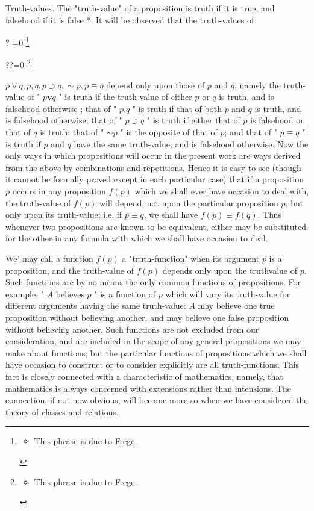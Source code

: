 \documentclass[10pt]{article}
\let\svthefootnote\thefootnote
\newcommand\blfootnotetext[1]{%
  \let\thefootnote\relax\footnote{#1}%
  \addtocounter{footnote}{-1}%
  \let\thefootnote\svthefootnote%
}
\let\svfootnotetext\footnotetext
\renewcommand\footnotetext[2][?]{%
  \if\relax#1\relax%
    \ifnum\value{footnote}=0\blfootnotetext{#2}\else\svfootnotetext{#2}\fi%
  \else%
    \if?#1\ifnum\value{footnote}=0\blfootnotetext{#2}\else\svfootnotetext{#2}\fi%
    \else\svfootnotetext[#1]{#2}\fi%
  \fi
}
\begin{document}
Truth-values. The "truth-value" of a proposition is truth if it is true, and falsehood if it is false *. It will be observed that the truth-values of

\footnotetext{\begin{itemize}
  \item This phrase is due to Frege.
\end{itemize}
}
$p \vee q, p, q, p \supset q, \sim p, p \equiv q$ depend only upon those of $p$ and $q$, namely the truth-value of " $p \mathbf{v} q$ " is truth if the truth-value of either $p$ or $q$ is truth, and is falsehood otherwise ; that of " $p . q$ " is truth if that of both $p$ and $q$ is truth, and is falsehood otherwise; that of " $p \supset q$ " is truth if either that of $p$ is falsehood or that of $q$ is truth; that of " $\sim p$ " is the opposite of that of $p$; and that of " $p \equiv q$ " is truth if $p$ and $q$ have the same truth-value, and is falsehood otherwise. Now the only ways in which propositions will occur in the present work are ways derived from the above by combinations and repetitions. Hence it is easy to see (though it cannot be formally proved except in each particular case) that if a proposition $p$ occurs in any proposition $f(p)$ which we shall ever have occasion to deal with, the truth-value of $f(p)$ will depend, not upon the particular proposition $p$, but only upon its truth-value; i.e. if $p \equiv q$, we shall have $f(p) \equiv f(q)$. Thus whenever two propositions are known to be equivalent, either may be substituted for the other in any formula with which we shall have occasion to deal.

We' may call a function $f(p)$ a "truth-function" when its argument $p$ is a proposition, and the truth-value of $f(p)$ depends only upon the truthvalue of $p$. Such functions are by no means the only common functions of propositions. For example, " $A$ believes $p$ " is a function of $p$ which will vary its truth-value for different arguments having the same truth-value: $A$ may believe one true proposition without believing another, and may believe one false proposition without believing another. Such functions are not excluded from our consideration, and are included in the scope of any general propositions we may make about functions; but the particular functions of propositions which we shall have occasion to construct or to consider explicitly are all truth-functions. This fact is closely connected with a characteristic of mathematics, namely, that mathematics is always concerned with extensions rather than intensions. The connection, if not now obvious, will become more so when we have considered the theory of classes and relations.
\end{document}
